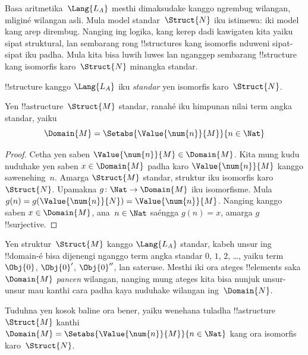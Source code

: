 \documentclass[../../../include/open-logic-section]{subfiles}
\begin{document}

Basa aritmetika~$\Lang{L_A}$
mesthi dimaksudake kanggo
ngrembug wilangan, mliginé
wilangan asli. Mula model
standar~$\Struct{N}$ iku
istimewa: iki model kang
arep dirembug. Nanging
ing logika, kang kerep
dadi kawigaten kita yaiku
sipat struktural, lan
sembarang rong !!{structure}s
kang isomorfis nduweni
sipat-sipat iku padha.
Mula kita bisa luwih luwes
lan nganggep sembarang
!!{structure} kang isomorfis
karo~$\Struct{N}$
minangka standar.

\begin{defn}
!!{structure} kanggo
$\Lang{L_A}$ iku
\emph{standar} yen isomorfis
karo~$\Struct{N}$.
\end{defn}

\begin{prop}
Yen !!a{structure}~$\Struct{M}$
standar, ranahé iku
himpunan nilai term angka
standar, yaiku
\[
\Domain{M} = \Setabs{\Value{\num{n}}{M}}{n \in \Nat}
\]
\end{prop}

\begin{proof}
Cetha yen saben
$\Value{\num{n}}{M} \in \Domain{M}$.
Kita mung kudu nuduhake
yen saben $x \in \Domain{M}$
padha karo $\Value{\num{n}}{M}$
kanggo sawenehing~$n$.
Amarga $\Struct{M}$ standar,
struktur iku isomorfis
karo~$\Struct{N}$.
Upamakna $g\colon
\Nat \to \Domain{M}$
iku isomorfisme.
Mula $g(n) =
g(\Value{\num{n}}{N}) =
\Value{\num{n}}{M}$.
Nanging kanggo saben
$x \in \Domain{M}$,
ana~$n
\in \Nat$ saéngga
$g(n) = x$,
amarga $g$ !!{surjective}.
\end{proof}

\begin{explain}
Yen struktur~$\Struct{M}$
kanggo $\Lang{L_A}$ standar,
kabeh unsur ing
!!{domain}-é bisa dijenengi
nganggo term angka standar
$\num{0}$, $\num{1}$,
$\num{2}$, \dots,
yaiku term $\Obj{0}$,
$\Obj{0}'$, $\Obj{0}''$,
lan sateruse. Mesthi
iki ora ateges
!!{element}s saka
$\Domain{M}$ \emph{pancen}
wilangan, nanging mung
ateges kita bisa
nunjuk unsur-unsur mau
kanthi cara padha
kaya nuduhake wilangan
ing~$\Domain{N}$.
\end{explain}

\begin{prob}
Tuduhna yen kosok baline
ora bener, yaiku wenehana
tuladha !!a{structure}~$\Struct{M}$
kanthi $\Domain{M} =
\Setabs{\Value{\num{n}}{M}}{n \in \Nat}$
kang ora isomorfis
karo~$\Struct{N}$.
\end{prob}
\end{document}

